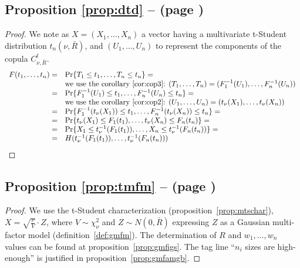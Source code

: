 \documentclass[11pt,fleqn]{book} %
\begin{document}
\subsection{Proposition \ref{prop:dtd} --  (page \pageref{prop:dtd})}
\begin{proof}
	We note as $X=(X_1,\dots,X_n)$ a vector having a multivariate t-Student
	distribution $t_n(\nu,\bar{R})$, and $(U_1,\dots,U_n)$ to represent
	the components of the copula $C_{\nu,\bar{R}}^t$.
	\begin{displaymath}
		\begin{array}{rl}
			F(t_1,\dots,t_n) = & \Pr\{ T_1 \le t_1 , \dots, T_n \le t_n \} = \\
			                   & \text{we use the corollary~\ref{cor:cop3}: }
			(T_1,\dots,T_n) = (F_1^{-1}(U_1),\dots,F_n^{-1}(U_n)) \\
			=                  & \Pr\{ F_1^{-1}(U_1) \le t_1 , \dots , F_n^{-1}(U_n) \le t_n \} = \\
			                   & \text{we use the corollary~\ref{cor:cop2}: }
			(U_1,\dots,U_n) = (t_\nu(X_1),\dots,t_\nu(X_n)) \\
			=                  & \Pr\{ F_1^{-1}(t_\nu(X_1)) \le t_1 , \dots , F_n^{-1}(t_\nu(X_n)) \le t_n \} = \\
			=                  & \Pr\{ t_\nu(X_1) \le F_1(t_1), \dots , t_\nu(X_n) \le F_n(t_n) \} = \\
			=                  & \Pr\{ X_1 \le t_\nu^{-1}(F_1(t_1)), \dots , X_n \le t_\nu^{-1}(F_n(t_n)) \} = \\
			=                  & H(t_\nu^{-1}(F_1(t_1)), \dots, t_\nu^{-1}(F_n(t_n))) \\
		\end{array}
	\end{displaymath}
\end{proof}

\subsection{Proposition \ref{prop:tmfm} --  (page \pageref{prop:tmfm})}
\begin{proof}
	We use the t-Student characterization (proposition~\ref{prop:mtschar}),
	$X = \sqrt{\frac{\nu}{V}} \cdot Z$, where $V \sim \chi_{\nu}^2$ and 
	$Z \sim N(0,\bar{R})$ expressing $Z$ as a Gaussian multi-factor model 
	(definition~\ref{def:gmfm}). The determination of $R$ and $w_1,\dots,w_n$
	values can be found at proposition~\ref{prop:gmfigs}. The tag line 
	\enquote{$n_i$ sizes are high-enough} is justified in 
	proposition~\ref{prop:gmfamgb}.
\end{proof}
\end{document}
